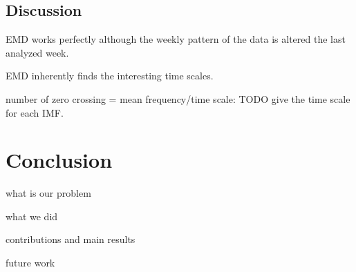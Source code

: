 \subsection{Discussion}
EMD works perfectly although the weekly pattern of the data is altered the last analyzed week.

EMD inherently finds the interesting time scales.

number of zero crossing = mean frequency/time scale:
  TODO give the time scale for each IMF.


\section{Conclusion}
what is our problem

what we did

contributions and main results

future work